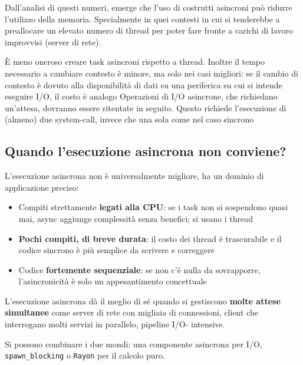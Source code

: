 Dall'analisi di questi numeri, emerge che l'uso di costrutti asincroni può ridurre
l'utilizzo della memoria. Specialmente in quei contesti in cui si tenderebbe a preallocare un elevato numero di thread per poter
fare fronte a carichi di lavoro improvvisi (server di rete).

È meno oneroso creare task asincroni rispetto a thread. Inoltre il tempo necessario a cambiare contesto è minore, ma solo nei casi migliori: se il cambio di
contesto è dovuto alla disponibilità di dati su una periferica su cui si intende eseguire I/O, il costo è
analogo
Operazioni di I/O asincrone, che richiedano un'attesa, dovranno essere ritentate in
seguito. Questo richiede l'esecuzione di (almeno) due system-call, invece che una sola come nel caso sincrono

\subsection{Quando l'esecuzione asincrona non conviene?}


L'esecuzione asincrona non è universalmente migliore, ha un dominio di
applicazione preciso:

\begin{itemize}
  \item Compiti strettamente \textbf{legati alla CPU}: se i task non si
        sospendono quasi mai, async aggiunge complessità senza benefici; si usano i
        thread

  \item \textbf{Pochi compiti, di breve durata}: il costo dei thread è trascurabile e il codice sincrono è più semplice da
        scrivere e correggere

  \item Codice \textbf{fortemente sequenziale}: se non c'è nulla da sovrapporre, l'asincronicità è solo un
        appesantimento concettuale
\end{itemize}

L'esecuzione asincrona dà il meglio di sé quando si gestiscono \textbf{molte attese
  simultanee} come server di rete con migliaia di connessioni, client che interrogano molti servizi in parallelo, pipeline I/O-
intensive.

Si possono combinare i due mondi: una componente asincrona per I/O, \verb|spawn_blocking| o \verb|Rayon|
per il calcolo puro.






